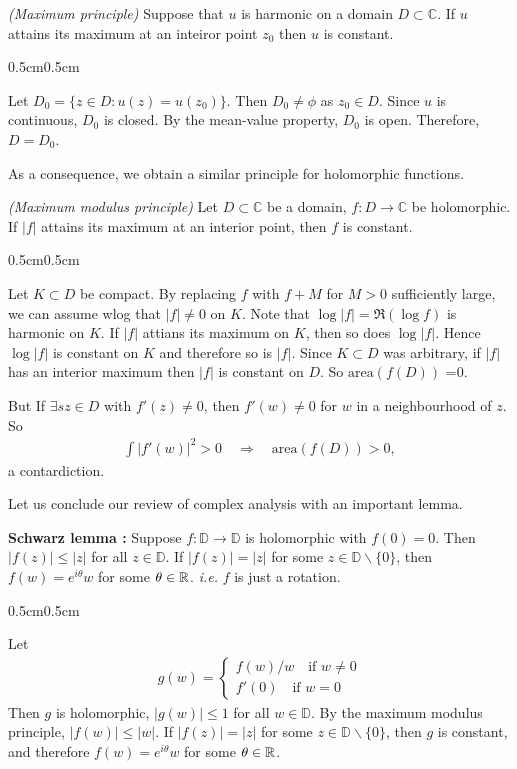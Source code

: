 \documentclass[12pt,a4paper]{article}
\newenvironment{proof}
{\begin{changemargin}{0.5cm}{0.5cm} 
	}%
	{\end{changemargin}
}
\newenvironment{p}
{\begin{proof} 
	}%
	{\end{proof}
}
\begin{document}
\thm \emph{(Maximum principle)} Suppose that $u$ is harmonic on a domain $D\subset \mathbb{C}$. If $u$ attains its maximum at an inteiror point $z_0$ then $u$ is constant.
\begin{p}
\pf Let $D_0 = \{z\in D : u(z) = u(z_0) \}$. Then $D_0 \neq \phi$ as $z_0 \in D$. Since $u$ is continuous, $D_0$ is closed. By the mean-value property, $D_0$ is open. Therefore, $D=D_0$.

\eop
\end{p}
\s

As a consequence, we obtain a similar principle for holomorphic functions.
\s

\thm \emph{(Maximum modulus principle)} Let $D\subset \mathbb{C}$ be a domain, $f: D\rightarrow \mathbb{C}$ be holomorphic. If $|f|$ attains its maximum at an interior point, then $f$ is constant.
\begin{p}
\pf Let $K\subset D$ be compact. By replacing $f$ with $f+M$ for $M>0$ sufficiently large, we can assume wlog that $|f|\neq 0$ on $K$. Note that $\log |f| = \Re (\log f)$ is harmonic on $K$. If $|f|$ attians its maximum on $K$, then so does $\log |f|$. Hence $\log |f|$ is constant on $K$ and therefore so is $|f|$. Since $K\subset D$ was arbitrary, if $|f|$ has an interior maximum then $|f|$ is constant on $D$. So $\text{area}(f(D))$ =0.

\quad But If $\exists sz\in D$ with $f'(z) \neq 0$, then $f'(w) \neq 0$ for $w$ in a neighbourhood of $z$. So
\begin{align*}
\int |f'(w)|^2 > 0 \quad \Rightarrow \quad \text{area}(f(D))>0, 
\end{align*}
a contardiction.

\eop
\end{p}
\s

Let us conclude our review of complex analysis with an important lemma.
\s

\textbf{Schwarz lemma :} Suppose $f: \mathbb{D} \rightarrow \mathbb{D}$ is holomorphic with $f(0)=0$. Then $|f(z)| \leq |z|$ for all $z\in \mathbb{D}$. If $|f(z)| = |z|$ for some $z\in \mathbb{D} \backslash\{0\}$, then $f(w) = e^{i\theta} w$ for some $\theta \in \mathbb{R}$. \textit{i.e.} $f$ is just a rotation.
\begin{p}
\pf Let
\begin{align*}
g(w) = \begin{cases}
f(w) /w \quad \text{if } w\neq 0 \\
f'(0) \quad \text{if } w = 0
\end{cases}
\end{align*}
Then $g$ is holomorphic, $|g(w)|\leq 1$ for all $w\in \mathbb{D}$. By the maximum modulus principle, $|f(w)| \leq |w|$. If $|f(z)|= |z|$ for some $z\in \mathbb{D} \backslash \{0\}$, then $g$ is constant, and therefore $f(w) = e^{i\theta} w$ for some $\theta \in \mathbb{R}$.

\eop
\end{p}
\end{document}
